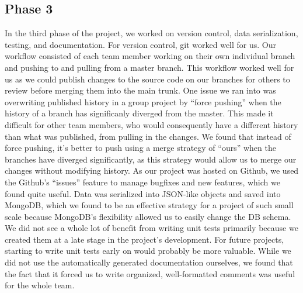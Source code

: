 \documentclass[letterpaper, 12pt]{article}
\begin{document}
\subsection{Phase 3}
In the third phase of the project, we worked on version control, data serialization, testing, and documentation. For version control, git worked well for us. Our workflow consisted of each team member working on their own individual branch and pushing to and pulling from a master branch.  This workflow worked well for us as we could publish changes to the source code on our branches for others to review before merging them into the main trunk.  One issue we ran into was overwriting published history in a group project by ``force pushing'' when the history of a branch has significanly diverged from the master. This made it difficult for other team members, who would consequently have a different history than what was published, from pulling in the changes. We found that instead of force pushing, it's better to push using a merge strategy of ``ours'' when the branches have diverged significantly, as this strategy would allow us to merge our changes without modifying history.  As our project was hosted on Github, we used the Github's ``issues'' feature to manage bugfixes and new features, which we found quite useful. Data was serialized into JSON-like objects and saved into MongoDB, which we found to be an effective strategy for a project of such small scale because MongoDB's flexibility allowed us to easily change the DB schema. We did not see a whole lot of benefit from writing unit tests primarily because we created them at a late stage in the project's development. For future projects, starting to write unit tests early on would probably be more valuable. While we did not use the automatically generated documentation ourselves, we found that the fact that it forced us to write organized, well-formatted comments was useful for the whole team.
\end{document}
